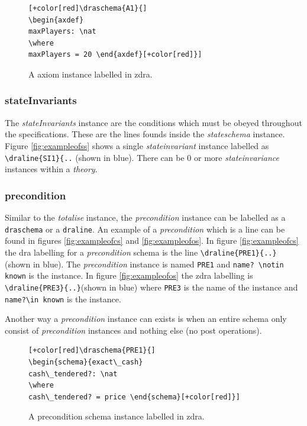 \begin{figure}[H]
\centering
\begin{footnotesize}
\begin{BVerbatim}[commandchars=+\[\]] [+color[red]\draschema{A1}{]
\begin{axdef}
maxPlayers: \nat
\where
maxPlayers = 20 \end{axdef}[+color[red]}]
\end{BVerbatim}
\end{footnotesize}
\caption{\label{fig:exampleofa} A axiom instance labelled in \gls{zdra}.}
\end{figure}

\subsubsection{stateInvariants}
The \emph{stateInvariants} instance are the conditions which must be obeyed
throughout the specifications. These are the lines founds inside the
\emph{stateschema} instance. Figure \ref{fig:exampleofss} shows a single
\emph{stateinvariant} instance labelled as \verb|\draline{SI1}{..| (shown in
blue). There can be 0 or more \emph{stateinvariance} instances within a
\emph{theory}.

\subsubsection{precondition}

Similar to the \emph{totalise} instance, the \emph{precondition} instance can be
labelled as a \verb|draschema| or a \verb|draline|. An example of a
\emph{precondition} which is a line can be found in figures
\ref{fig:exampleofcs} and \ref{fig:exampleofos}. In figure \ref{fig:exampleofcs}
the \gls{dra} labelling for a \emph{precondition} schema is the line
\verb|\draline{PRE1}{..}| (shown in blue). The \emph{precondition} instance is
named \verb|PRE1| and \verb|name? \notin known| is the instance. In figure
\ref{fig:exampleofos} the \gls{zdra} labelling is 
\verb|\draline{PRE3}{..}|(shown in blue) where \verb|PRE3| is the name of the
instance and 
\verb|name?\in known| is the instance.

Another way a \emph{precondition} instance can exists is when an entire schema
only consist of \emph{precondition} instances and nothing else (no post
operations).

\begin{figure}[H]
\centering
\begin{footnotesize}
\begin{BVerbatim}[commandchars=+\[\]] [+color[red]\draschema{PRE1}{]
\begin{schema}{exact\_cash}
cash\_tendered?: \nat
\where
cash\_tendered? = price \end{schema}[+color[red]}]
\end{BVerbatim}
\end{footnotesize}
\caption{\label{fig:exampleofpre} A precondition schema instance labelled in \gls{zdra}.}
\end{figure}

